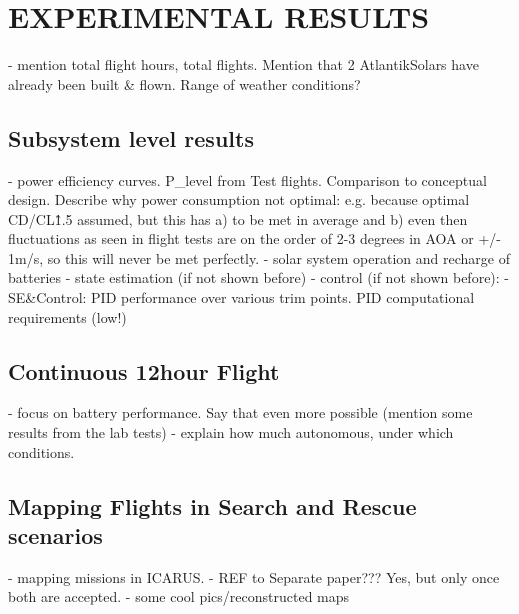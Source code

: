 \section{EXPERIMENTAL RESULTS}
   
 - mention total flight hours, total flights. Mention that 2 AtlantikSolars have already been built \& flown.  Range of weather conditions?
 
\subsection{Subsystem level results}
 
   - power efficiency curves. P\_level from Test flights. Comparison to conceptual design. Describe why power consumption not optimal: e.g. because optimal CD/CL\^1.5 assumed, but this has a) to be met in average and b) even then fluctuations as seen in flight tests are on the order of 2-3 degrees in AOA or +/- 1m/s, so this will never be met perfectly.
 - solar system operation and recharge of batteries
 - state estimation (if not shown before)
 - control (if not shown before):   - SE\&Control: PID performance over various trim points. PID computational requirements (low!)
  
\subsection{Continuous 12hour Flight}
  
   - focus on battery performance. Say that even more possible (mention some results from the lab tests)
   - explain how much autonomous, under which conditions.
  
\subsection{Mapping Flights in Search and Rescue scenarios}
   
    - mapping missions in ICARUS. 
    - REF to Separate paper??? Yes, but only once both are accepted.
    - some cool pics/reconstructed maps